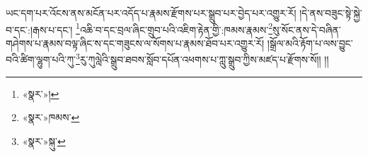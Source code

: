 ཡང་དག་པར་འོངས་ནས་མངོན་པར་འདོད་པ་རྣམས་རྫོགས་པར་སྒྲུབ་པར་བྱེད་པར་འགྱུར་རོ། །དེ་ནས་བཟུང་སྟེ་སྐྱེ་བ་དང་:།རྒས་པ་དང་། \footnote{«སྣར་»། }འཆི་བ་དང་བྲལ་ཞིང་གྲུབ་པའི་འཇིག་རྟེན་གྱི་:ཁམས་རྣམས་\footnote{«སྣར་»ཁམས་}སུ་སོང་ནས་དེ་བཞིན་གཤེགས་པ་རྣམས་བལྟ་ཞིང་ས་དང་གཟུངས་ལ་སོགས་པ་རྣམས་ཐོབ་པར་འགྱུར་རོ། །སྒྲོལ་མའི་རྟོག་པ་ལས་བྱུང་བའི་ཚིག་ལྷུག་པའི་ཀུ་\footnote{«སྣར་»སྐུ་}རུ་ཀུལླེའི་སྒྲུབ་ཐབས་སློབ་དཔོན་འཕགས་པ་ཀླུ་སྒྲུབ་ཀྱིས་མཛད་པ་རྫོགས་སོ།། །།